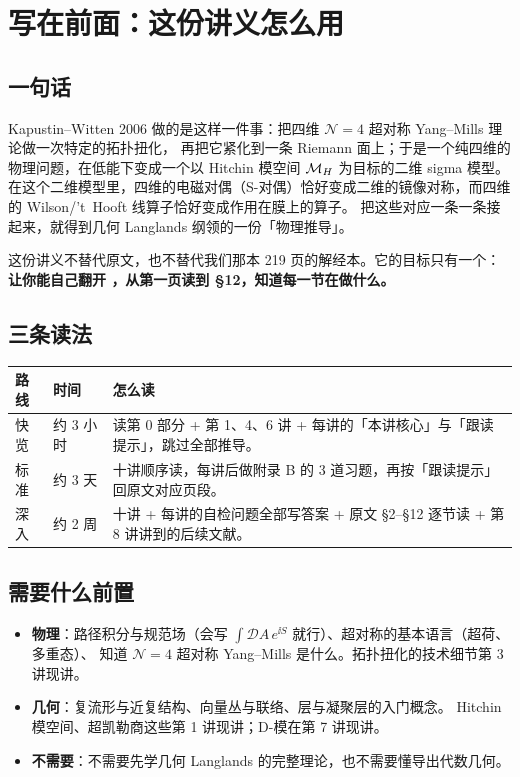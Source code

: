 \section*{写在前面：这份讲义怎么用}

\subsection*{一句话}

Kapustin--Witten 2006 \cite{kw06} 做的是这样一件事：把四维 $\mathcal N=4$ 超对称 Yang--Mills 理论做一次特定的拓扑扭化，
再把它紧化到一条 Riemann 面上；于是一个纯四维的物理问题，在低能下变成一个以 Hitchin 模空间 $\mathcal{M}_{H}$ 为目标的二维 sigma 模型。
在这个二维模型里，四维的电磁对偶（S-对偶）恰好变成二维的镜像对称，而四维的 Wilson/'t~Hooft 线算子恰好变成作用在膜上的算子。
把这些对应一条一条接起来，就得到几何 Langlands 纲领的一份「物理推导」。

这份讲义不替代原文，也不替代我们那本 219 页的解经本。它的目标只有一个：
\textbf{让你能自己翻开 \cite{kw06}，从第一页读到 §12，知道每一节在做什么。}

\subsection*{三条读法}

\begin{center}
\begin{tabular}{@{}llp{8.6cm}@{}}
\toprule
路线 & 时间 & 怎么读 \\
\midrule
快览 & 约 3 小时 & 读第 0 部分 + 第 1、4、6 讲 + 每讲的「本讲核心」与「跟读提示」，跳过全部推导。 \\
标准 & 约 3 天 & 十讲顺序读，每讲后做附录 B 的 3 道习题，再按「跟读提示」回原文对应页段。 \\
深入 & 约 2 周 & 十讲 + 每讲的自检问题全部写答案 + 原文 §2--§12 逐节读 + 第 8 讲讲到的后续文献。 \\
\bottomrule
\end{tabular}
\end{center}

\subsection*{需要什么前置}

\begin{itemize}
\item \textbf{物理}：路径积分与规范场（会写 $\int \mathcal D A\, e^{\ii S}$ 就行）、超对称的基本语言（超荷、多重态）、
      知道 $\mathcal N=4$ 超对称 Yang--Mills 是什么。拓扑扭化的技术细节第 3 讲现讲。
\item \textbf{几何}：复流形与近复结构、向量丛与联络、层与凝聚层的入门概念。
      Hitchin 模空间、超凯勒商这些第 1 讲现讲；D-模在第 7 讲现讲。
\item \textbf{不需要}：不需要先学几何 Langlands 的完整理论，也不需要懂导出代数几何。
\end{itemize}

